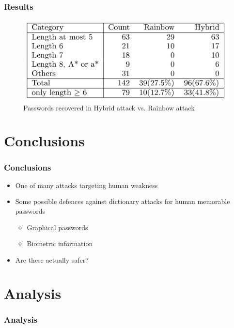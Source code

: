\documentclass{beamer}
\begin{document}
\begin{frame}
\frametitle{Results}
\begin{figure}
\includegraphics[width=0.9\linewidth]{figs/results}
\caption{Passwords recovered in Hybrid attack vs. Rainbow attack}
\end{figure}
\end{frame}

\section{Conclusions} 

\begin{frame}
\frametitle{Conclusions}
\begin{itemize}
\item One of many attacks targeting human weakness
\item Some possible defences against dictionary attacks for human memorable passwords
\begin{itemize}
\item Graphical passwords
\item Biometric information
\end{itemize}
\item Are these actually safer?
\end{itemize}
\end{frame}


\section{Analysis} 
\begin{frame}
\frametitle{Analysis}

\end{frame}
\end{document}
